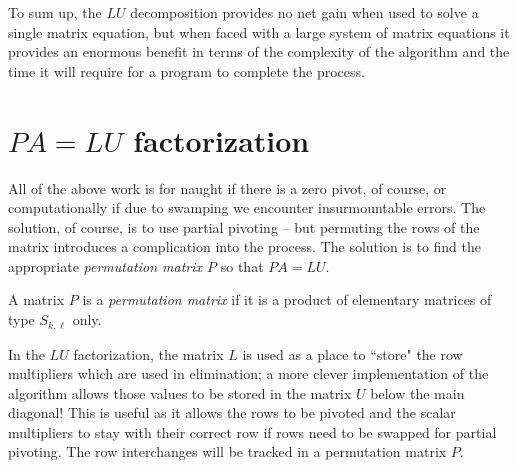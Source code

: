 \documentclass[m3380-lec-main.tex]{subfiles}
\begin{document}
To sum up, the $LU$ decomposition provides no net gain when used to solve a single matrix equation, but when faced with a large system of matrix equations it provides an enormous benefit in terms of the complexity of the algorithm and the time it will require for a program to complete the process.

%
\section{$PA=LU$ factorization} All of the above work is for naught if there is a zero pivot, of course, or computationally if due to swamping we encounter insurmountable errors. The solution, of course, is to use partial pivoting -- but permuting the rows of the matrix introduces a complication into the process. The solution is to find the appropriate \emph{permutation matrix $P$} so that $PA=LU$.

\begin{defn} A matrix $P$ is a \emph{permutation matrix} if it is a product of elementary matrices of type $S_{k,\ell}$ only.
\end{defn}

In the $LU$ factorization, the matrix $L$ is used as a place to ``store" the row multipliers which are used in elimination; a more clever implementation of the algorithm allows those values to be stored in the matrix $U$ below the main diagonal! This is useful as it allows the rows to be pivoted and the scalar multipliers to stay with their correct row if rows need to be swapped for partial pivoting. The row interchanges will be tracked in a permutation matrix $P$.
\end{document}
